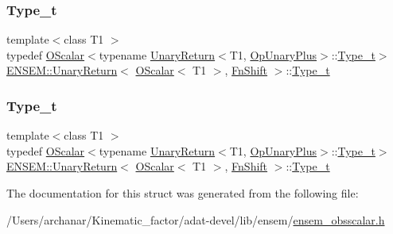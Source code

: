 \subsubsection{\texorpdfstring{Type\_t}{Type\_t}\hspace{0.1cm}{\footnotesize\ttfamily [2/3]}}
{\footnotesize\ttfamily template$<$class T1 $>$ \\
typedef \mbox{\hyperlink{classENSEM_1_1OScalar}{O\+Scalar}}$<$typename \mbox{\hyperlink{structENSEM_1_1UnaryReturn}{Unary\+Return}}$<$T1, \mbox{\hyperlink{structENSEM_1_1OpUnaryPlus}{Op\+Unary\+Plus}}$>$\+::\mbox{\hyperlink{structENSEM_1_1UnaryReturn_3_01OScalar_3_01T1_01_4_00_01FnShift_01_4_a800574635cdc9328aeda8a2f34cd559d}{Type\+\_\+t}}$>$ \mbox{\hyperlink{structENSEM_1_1UnaryReturn}{E\+N\+S\+E\+M\+::\+Unary\+Return}}$<$ \mbox{\hyperlink{classENSEM_1_1OScalar}{O\+Scalar}}$<$ T1 $>$, \mbox{\hyperlink{structENSEM_1_1FnShift}{Fn\+Shift}} $>$\+::\mbox{\hyperlink{structENSEM_1_1UnaryReturn_3_01OScalar_3_01T1_01_4_00_01FnShift_01_4_a800574635cdc9328aeda8a2f34cd559d}{Type\+\_\+t}}}

\mbox{\label{structENSEM_1_1UnaryReturn_3_01OScalar_3_01T1_01_4_00_01FnShift_01_4_a800574635cdc9328aeda8a2f34cd559d}} 
\subsubsection{\texorpdfstring{Type\_t}{Type\_t}\hspace{0.1cm}{\footnotesize\ttfamily [3/3]}}
{\footnotesize\ttfamily template$<$class T1 $>$ \\
typedef \mbox{\hyperlink{classENSEM_1_1OScalar}{O\+Scalar}}$<$typename \mbox{\hyperlink{structENSEM_1_1UnaryReturn}{Unary\+Return}}$<$T1, \mbox{\hyperlink{structENSEM_1_1OpUnaryPlus}{Op\+Unary\+Plus}}$>$\+::\mbox{\hyperlink{structENSEM_1_1UnaryReturn_3_01OScalar_3_01T1_01_4_00_01FnShift_01_4_a800574635cdc9328aeda8a2f34cd559d}{Type\+\_\+t}}$>$ \mbox{\hyperlink{structENSEM_1_1UnaryReturn}{E\+N\+S\+E\+M\+::\+Unary\+Return}}$<$ \mbox{\hyperlink{classENSEM_1_1OScalar}{O\+Scalar}}$<$ T1 $>$, \mbox{\hyperlink{structENSEM_1_1FnShift}{Fn\+Shift}} $>$\+::\mbox{\hyperlink{structENSEM_1_1UnaryReturn_3_01OScalar_3_01T1_01_4_00_01FnShift_01_4_a800574635cdc9328aeda8a2f34cd559d}{Type\+\_\+t}}}



The documentation for this struct was generated from the following file\+:\begin{DoxyCompactItemize}
\item 
/\+Users/archanar/\+Kinematic\+\_\+factor/adat-\/devel/lib/ensem/\mbox{\hyperlink{adat-devel_2lib_2ensem_2ensem__obsscalar_8h}{ensem\+\_\+obsscalar.\+h}}\end{DoxyCompactItemize}
